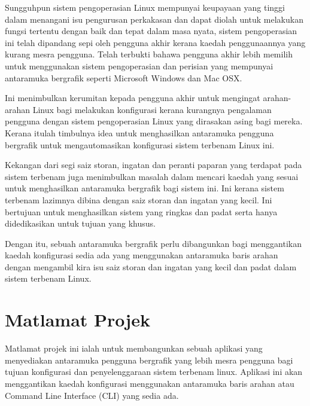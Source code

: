 Sungguhpun sistem pengoperasian Linux mempunyai keupayaan yang tinggi dalam menangani isu pengurusan perkakasan dan dapat diolah untuk melakukan fungsi tertentu dengan baik dan tepat dalam masa nyata, sistem pengoperasian ini telah dipandang sepi oleh pengguna akhir kerana kaedah penggunaannya yang kurang mesra pengguna. Telah terbukti bahawa pengguna akhir lebih memilih untuk menggunakan sistem pengoperasian dan perisian yang mempunyai antaramuka bergrafik seperti Microsoft Windows dan Mac OSX.

Ini menimbulkan kerumitan kepada pengguna akhir untuk mengingat arahan-arahan Linux bagi melakukan konfigurasi kerana kurangnya pengalaman pengguna dengan sistem pengoperasian Linux yang dirasakan asing bagi mereka. Kerana itulah timbulnya idea untuk menghasilkan antaramuka pengguna bergrafik untuk mengautomasikan konfigurasi sistem terbenam Linux ini.

Kekangan dari segi saiz storan, ingatan dan peranti paparan yang terdapat pada sistem terbenam juga menimbulkan masalah dalam mencari kaedah yang sesuai untuk menghasilkan antaramuka bergrafik bagi sistem ini. Ini kerana sistem terbenam lazimnya dibina dengan saiz storan dan ingatan yang kecil. Ini bertujuan untuk menghasilkan sistem yang ringkas dan padat serta hanya didedikasikan untuk tujuan yang khusus.

Dengan itu, sebuah antaramuka bergrafik perlu dibangunkan bagi menggantikan kaedah konfigurasi sedia ada yang menggunakan antaramuka baris arahan dengan mengambil kira isu saiz storan dan ingatan yang kecil dan padat dalam sistem terbenam Linux.

\section{Matlamat Projek}
Matlamat projek ini ialah untuk membangunkan sebuah aplikasi yang menyediakan antaramuka pengguna bergrafik yang lebih mesra pengguna bagi tujuan konfigurasi dan penyelenggaraan sistem terbenam linux. Aplikasi ini akan menggantikan kaedah konfigurasi menggunakan antaramuka baris arahan atau Command Line Interface (CLI) yang sedia ada.

